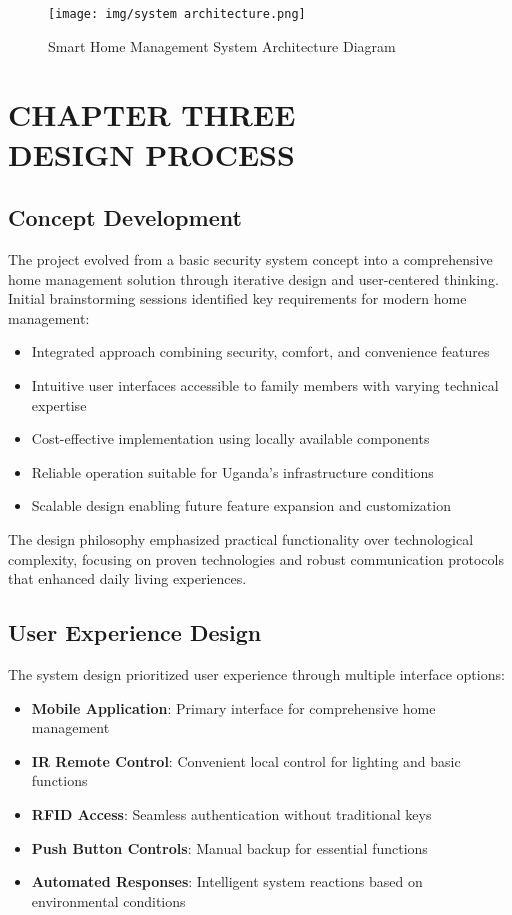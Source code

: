 \documentclass[12pt,a4paper]{report}
\begin{document}
\begin{figure}[H]
    \centering
    \texttt{[image: img/system architecture.png]}
    \caption{Smart Home Management System Architecture Diagram}
    \label{fig:system-architecture}
\end{figure}

\chapter[CHAPTER THREE DESIGN PROCESS]{CHAPTER THREE\\DESIGN PROCESS}

\section{Concept Development}

\noindent The project evolved from a basic security system concept into a comprehensive home management solution through iterative design and user-centered thinking. Initial brainstorming sessions identified key requirements for modern home management:

\begin{itemize}
\item Integrated approach combining security, comfort, and convenience features
\item Intuitive user interfaces accessible to family members with varying technical expertise
\item Cost-effective implementation using locally available components
\item Reliable operation suitable for Uganda's infrastructure conditions
\item Scalable design enabling future feature expansion and customization
\end{itemize}

\noindent The design philosophy emphasized practical functionality over technological complexity, focusing on proven technologies and robust communication protocols that enhanced daily living experiences.

\section{User Experience Design}

\noindent The system design prioritized user experience through multiple interface options:

\begin{itemize}
\item \textbf{Mobile Application}: Primary interface for comprehensive home management
\item \textbf{IR Remote Control}: Convenient local control for lighting and basic functions
\item \textbf{RFID Access}: Seamless authentication without traditional keys
\item \textbf{Push Button Controls}: Manual backup for essential functions
\item \textbf{Automated Responses}: Intelligent system reactions based on environmental conditions
\end{itemize}
\end{document}
